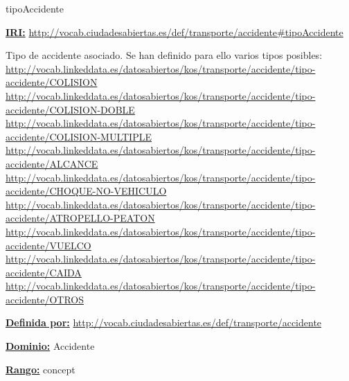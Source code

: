 \begin{mybox}{tipoAccidente}
\begin{flushleft}
\underline{\textbf{IRI:}}
\url{http://vocab.ciudadesabiertas.es/def/transporte/accidente#tipoAccidente}
\newline

Tipo de accidente asociado. Se han definido para ello varios tipos posibles:
\newline \url{http://vocab.linkeddata.es/datosabiertos/kos/transporte/accidente/tipo-accidente/COLISION}
\newline \url{http://vocab.linkeddata.es/datosabiertos/kos/transporte/accidente/tipo-accidente/COLISION-DOBLE}
\newline \url{http://vocab.linkeddata.es/datosabiertos/kos/transporte/accidente/tipo-accidente/COLISION-MULTIPLE}
\newline \url{http://vocab.linkeddata.es/datosabiertos/kos/transporte/accidente/tipo-accidente/ALCANCE}
\newline \url{http://vocab.linkeddata.es/datosabiertos/kos/transporte/accidente/tipo-accidente/CHOQUE-NO-VEHICULO}
\newline \url{http://vocab.linkeddata.es/datosabiertos/kos/transporte/accidente/tipo-accidente/ATROPELLO-PEATON}
\newline \url{http://vocab.linkeddata.es/datosabiertos/kos/transporte/accidente/tipo-accidente/VUELCO}
\newline \url{http://vocab.linkeddata.es/datosabiertos/kos/transporte/accidente/tipo-accidente/CAIDA}
\newline \url{http://vocab.linkeddata.es/datosabiertos/kos/transporte/accidente/tipo-accidente/OTROS}
\newline

\underline{\textbf{Definida por:}}
\newline \url{http://vocab.ciudadesabiertas.es/def/transporte/accidente}
\newline

\underline{\textbf{Dominio:}}  Accidente
\newline

\underline{\textbf{Rango:}}  concept
\newline

\end{flushleft}
\end{mybox}




